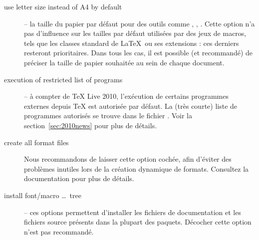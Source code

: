 \documentclass[german, english, french]{article}
\renewcommand{\TL}{\TeX{} Live\xspace}%
\begin{document}
\begin{description}
\item[use letter size instead of A4 by default] -- la taille du papier par
  défaut pour des outils comme , , .  Cette
  option n'a pas d'influence sur les tailles par défaut utilisées par des jeux
  de macros, tels que les classes standard de \LaTeX\ ou ses extensions : ces
  derniers resteront prioritaires. Dans tous les cas, il est possible (et
  recommandé) de préciser la taille de papier souhaitée au sein de chaque
  document.

\item[execution of restricted list of programs] -- à compter de \TL 2010,
  l'exécution de certains programmes externes depuis \TeX{} est autorisée par
  défaut. La (très courte) liste de programmes autorisés se trouve dans le
  fichier . Voir la section~\ref{sec:2010news} pour plus de
  détails.

\item [create all format files] Nous recommandons de laisser cette option
  cochée, afin d'éviter des problèmes inutiles lors de la création dynamique de
  formats.  Consultez la documentation  pour plus de détails.


\item[install font/macro \ldots\ tree] -- ces options permettent d'installer les
  fichiers de documentation et les fichiers source présents dans la plupart des
  paquets. Décocher cette option n'est pas recommandé.


\end{description}
\end{document}

